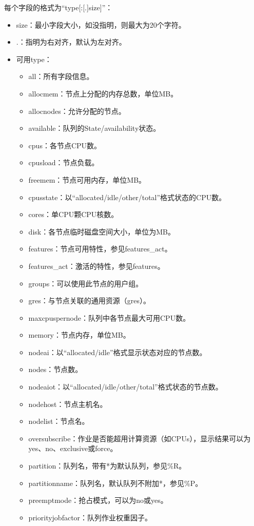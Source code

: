 \begin{itemize}
每个字段的格式为``type[:[.]size]''：
\begin{itemize}
	\item size：最小字段大小，如没指明，则最大为20个字符。
    \item .：指明为右对齐，默认为左对齐。
	\item 可用type：
\begin{itemize}
   	\item all：所有字段信息。
   	\item allocmem：节点上分配的内存总数，单位MB。
   	\item allocnodes：允许分配的节点。
   	\item available：队列的State/availability状态。
   	\item cpus：各节点CPU数。
   	\item cpusload：节点负载。
   	\item freemem：节点可用内存，单位MB。
   	\item cpusstate：以``allocated/idle/other/total''格式状态的CPU数。
   	\item cores：单CPU颗CPU核数。
   	\item disk：各节点临时磁盘空间大小，单位为MB。
   	\item features：节点可用特性，参见features\_act。
   	\item features\_act：激活的特性，参见features。
   	\item groups：可以使用此节点的用户组。
   	\item gres：与节点关联的通用资源（gres）。
   	\item maxcpuspernode：队列中各节点最大可用CPU数。
   	\item memory：节点内存，单位MB。
   	\item nodeai：以``allocated/idle''格式显示状态对应的节点数。
   	\item nodes：节点数。
   	\item nodeaiot：以``allocated/idle/other/total''格式状态的节点数。
   	\item nodehost：节点主机名。
   	\item nodelist：节点名。
   	\item oversubscribe：作业是否能超用计算资源（如CPUs），显示结果可以为yes、no、exclusive或force。
   	\item partition：队列名，带有*为默认队列，参见\%R。
   	\item partitionname：队列名，默认队列不附加*，参见\%P。
   	\item preemptmode：抢占模式，可以为no或yes。
   	\item priorityjobfactor：队列作业权重因子。

\end{itemize}
\end{itemize}
\end{itemize}
